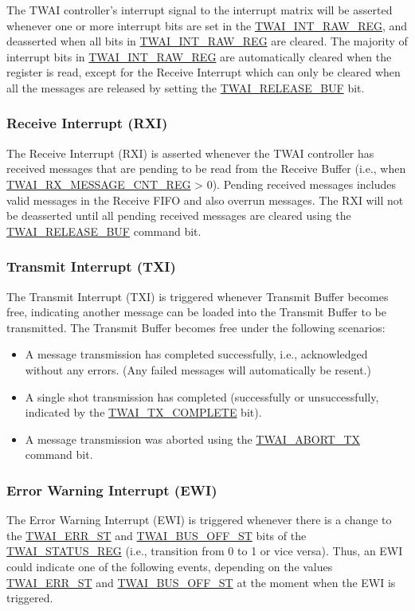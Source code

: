 \documentclass[main\_\_EN.tex]{subfiles}
\begin{document}
The TWAI controller's interrupt signal to the interrupt matrix will be asserted whenever one or more interrupt bits are set in the \hyperref[regdesc:TWAIINTRAWREG]{TWAI\_INT\_RAW\_REG}, and deasserted when all bits in \hyperref[regdesc:TWAIINTRAWREG]{TWAI\_INT\_RAW\_REG} are cleared. The majority of interrupt bits in \hyperref[regdesc:TWAIINTRAWREG]{TWAI\_INT\_RAW\_REG} are automatically cleared when the register is read, except for the Receive Interrupt which can only be cleared when all the messages are released by setting the \hyperref[fielddesc:TWAIRELEASEBUF]{TWAI\_RELEASE\_BUF} bit.

\subsubsection{Receive Interrupt (RXI)}
The Receive Interrupt (RXI) is asserted whenever the TWAI controller has received messages that are pending to be read from the Receive Buffer (i.e., when \hyperref[regdesc:TWAIRXMESSAGECNTREG]{TWAI\_RX\_MESSAGE\_CNT\_REG} > 0). Pending received messages includes valid messages in the Receive FIFO and also overrun messages. The RXI will not be deasserted until all pending received messages are cleared using the \hyperref[fielddesc:TWAIRELEASEBUF]{TWAI\_RELEASE\_BUF} command bit.


\subsubsection{Transmit Interrupt (TXI)}
The Transmit Interrupt (TXI) is triggered whenever Transmit Buffer becomes free, indicating another message can be loaded into the Transmit Buffer to be transmitted. The Transmit Buffer becomes free under the following scenarios:

\begin{itemize}
    \item A message transmission has completed successfully, i.e., acknowledged without any errors. (Any failed messages will automatically be resent.)
    \item A single shot transmission has completed (successfully or unsuccessfully, indicated by the \hyperref[fielddesc:TWAITXCOMPLETE]{TWAI\_TX\_COMPLETE} bit).
    \item A message transmission was aborted using the \hyperref[fielddesc:TWAIABORTTX]{TWAI\_ABORT\_TX} command bit.
\end{itemize}

\subsubsection{Error Warning Interrupt (EWI)}
The Error Warning Interrupt (EWI) is triggered whenever there is a change to the \hyperref[fielddesc:TWAIERRST]{TWAI\_ERR\_ST} and \hyperref[fielddesc:TWAIBUSOFFST]{TWAI\_BUS\_OFF\_ST} bits of the \hyperref[regdesc:TWAISTATUSREG]{TWAI\_STATUS\_REG} (i.e., transition from 0 to 1 or vice versa). Thus, an EWI could indicate one of the following events, depending on the values \hyperref[fielddesc:TWAIERRST]{TWAI\_ERR\_ST} and \hyperref[fielddesc:TWAIBUSOFFST]{TWAI\_BUS\_OFF\_ST} at the moment when the EWI is triggered.
\end{document}
